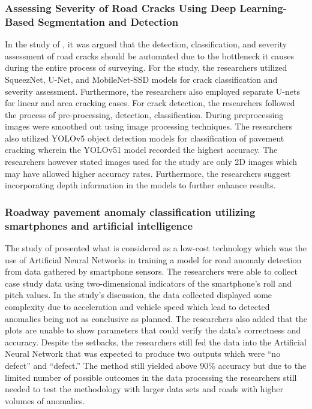 \subsubsection{Assessing Severity of Road Cracks Using Deep Learning-Based Segmentation and Detection}
In the study of , it was argued that the detection, classification, and severity assessment of road cracks should be automated due to the bottleneck it causes during the entire process of surveying. For the study, the researchers utilized SqueezNet, U-Net, and MobileNet-SSD models for crack classification and severity assessment. Furthermore, the researchers also employed separate U-nets for linear and area cracking cases. For crack detection, the researchers followed the process of pre-processing, detection, classification. During preprocessing images were smoothed out using image processing techniques. The researchers also utilized YOLOv5 object detection models for classification of pavement cracking wherein the YOLOv51 model recorded the highest accuracy. The researchers however stated images used for the study are only 2D images which may have allowed higher accuracy rates. Furthermore, the researchers suggest incorporating depth information in the models to further enhance results.

\subsubsection{Roadway pavement anomaly classification utilizing smartphones and artificial intelligence}
The study of  presented what is considered as a low-cost technology which was the use of Artificial Neural Networks in training a model for road anomaly detection from data gathered by smartphone sensors. The researchers were able to collect case study data using two-dimensional indicators of the smartphone’s roll and pitch values. In the study’s discussion, the data collected displayed some complexity due to acceleration and vehicle speed which lead to detected anomalies being not as conclusive as planned. The researchers also added that the plots are unable to show parameters that could verify the data’s correctness and accuracy. Despite the setbacks, the researchers still fed the data into the Artificial Neural Network that was expected to produce two outputs which were “no defect” and “defect.” The method still yielded above 90\% accuracy but due to the limited number of possible outcomes in the data processing the researchers still needed to test the methodology with larger data sets and roads with higher volumes of anomalies.

